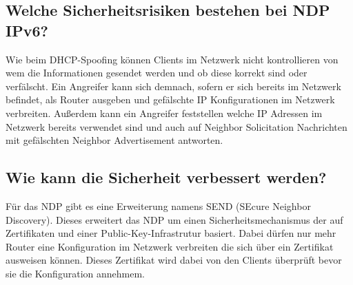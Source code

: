 \documentclass[a4paper,12pt]{article} %
\begin{document}
\subsection{Welche Sicherheitsrisiken bestehen bei NDP IPv6?}
Wie beim DHCP-Spoofing können Clients im Netzwerk nicht kontrollieren von wem die Informationen gesendet werden und ob diese korrekt sind oder verfälscht. Ein Angreifer kann sich demnach, sofern er sich bereits im Netzwerk befindet, als Router ausgeben und gefälschte IP Konfigurationen im Netzwerk verbreiten. 
Außerdem kann ein Angreifer feststellen welche IP Adressen im Netzwerk bereits verwendet sind und auch auf Neighbor Solicitation Nachrichten mit gefälschten Neighbor Advertisement antworten.

\subsection{Wie kann die Sicherheit verbessert werden? }
Für das NDP gibt es eine Erweiterung namens SEND (SEcure Neighbor Discovery). Dieses erweitert das NDP um einen Sicherheitsmechanismus der auf Zertifikaten und einer Public-Key-Infrastrutur basiert. Dabei dürfen nur mehr Router eine Konfiguration im Netzwerk verbreiten die sich über ein Zertifikat ausweisen können. Dieses Zertifikat wird dabei von den Clients überprüft bevor sie die Konfiguration annehmem.  

\newpage
\begin{appendix}
\end{appendix}

\newpage
{}
{}
\listoffigures


{}
{}
\lstlistoflistings

%
%

\end{document}
